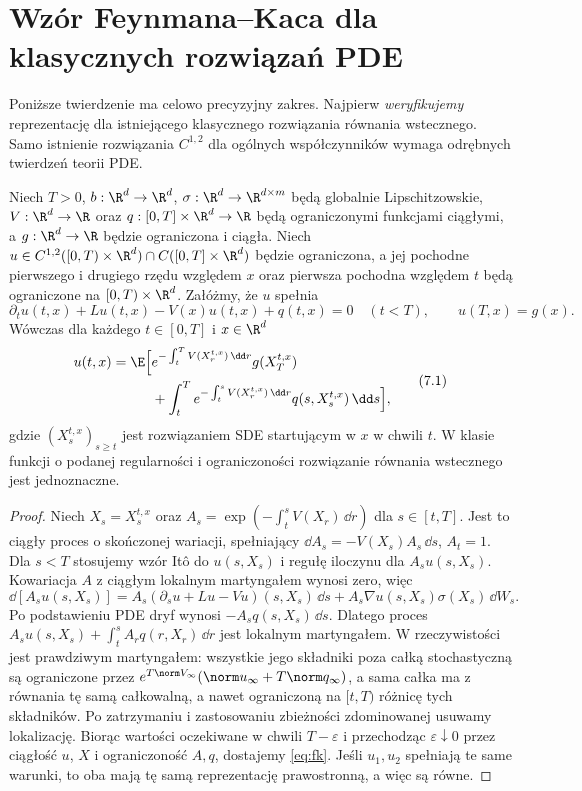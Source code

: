 \section{Wzór Feynmana--Kaca dla klasycznych rozwiązań PDE}

Poniższe twierdzenie ma celowo precyzyjny zakres.
Najpierw \emph{weryfikujemy} reprezentację dla
istniejącego klasycznego rozwiązania równania wstecznego.
Samo istnienie rozwiązania $C^{1,2}$ dla ogólnych
współczynników wymaga odrębnych twierdzeń teorii PDE.

\begin{twierdzenie}
\label{th:feynman-kac}
Niech $T>0$, $b:\R^d\to\R^d$,
$\sigma:\R^d\to\R^{d\times m}$ będą globalnie
Lipschitzowskie, $V:\R^d\to\R$ oraz
$q:[0,T]\times\R^d\to\R$ będą ograniczonymi funkcjami
ciągłymi, a $g:\R^d\to\R$ będzie ograniczona
i ciągła. Niech $u\in C^{1,2}([0,T)\times\R^d)
\cap C([0,T]\times\R^d)$ będzie ograniczona,
a jej pochodne pierwszego i drugiego rzędu względem
$x$ oraz pierwsza pochodna względem $t$ będą
ograniczone na $[0,T)\times\R^d$.
Załóżmy, że $u$ spełnia
\[
\partial_tu(t,x)+Lu(t,x)-V(x)u(t,x)+q(t,x)=0
\quad (t<T),\qquad u(T,x)=g(x).
\]
Wówczas dla każdego $t\in[0,T]$ i $x\in\R^d$
\[
\begin{split}
u(t,x)=\E\Big[&e^{-\int_t^T V(X_r^{t,x})\,\dd r}
                         g(X_T^{t,x})\\
 &+\int_t^T e^{-\int_t^s V(X_r^{t,x})\,\dd r}
                         q(s,X_s^{t,x})\,\dd s\Big],
\end{split}
\tag{7.1}\label{eq:fk}
\]
gdzie $(X_s^{t,x})_{s\ge t}$ jest rozwiązaniem SDE
startującym w $x$ w chwili $t$.
W klasie funkcji o podanej regularności i ograniczoności
rozwiązanie równania wstecznego jest jednoznaczne.
\end{twierdzenie}
\begin{proof}
Niech $X_s=X_s^{t,x}$ oraz
$A_s=\exp(-\int_t^sV(X_r)\,\dd r)$ dla $s\in[t,T]$.
Jest to ciągły proces o skończonej wariacji, spełniający
$\dd A_s=-V(X_s)A_s\,\dd s$, $A_t=1$.
Dla $s<T$ stosujemy wzór Itô do $u(s,X_s)$
i regułę iloczynu dla $A_su(s,X_s)$.
Kowariacja $A$ z ciągłym lokalnym martyngałem wynosi zero,
więc
\[
\dd[A_su(s,X_s)]
=A_s(\partial_su+Lu-Vu)(s,X_s)\,\dd s
 +A_s\nabla u(s,X_s)\sigma(X_s)\,\dd W_s.
\]
Po podstawieniu PDE dryf wynosi $-A_sq(s,X_s)\,\dd s$.
Dlatego proces
$A_su(s,X_s)+\int_t^sA_rq(r,X_r)\,\dd r$
jest lokalnym martyngałem. W rzeczywistości jest
prawdziwym martyngałem: wszystkie jego składniki poza
całką stochastyczną są ograniczone przez
$e^{T\norm V_\infty}(\norm u_\infty+T\norm q_\infty)$,
a sama całka ma z równania tę samą całkowalną,
a nawet ograniczoną na $[t,T)$ różnicę tych składników.
Po zatrzymaniu i zastosowaniu zbieżności zdominowanej
usuwamy lokalizację. Biorąc wartości oczekiwane
w chwili $T-\varepsilon$ i przechodząc $\varepsilon\downarrow0$
przez ciągłość $u$, $X$ i ograniczoność $A,q$, dostajemy
\eqref{eq:fk}.
Jeśli $u_1,u_2$ spełniają te same warunki, to oba
mają tę samą reprezentację prawostronną, a więc są równe.
\end{proof}

